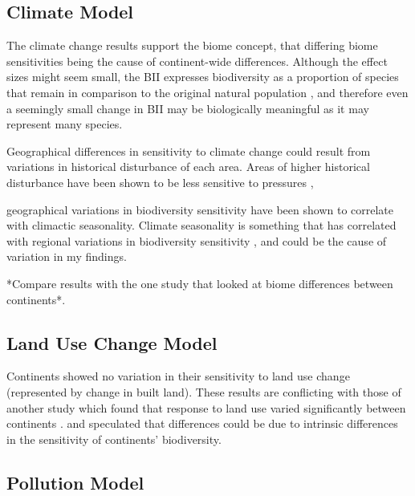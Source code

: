 \documentclass[11pt, a4paper, titlepage]{article}
\begin{document}
     \subsection*{Climate Model}
     
     The climate change results support the biome concept, that  differing biome sensitivities being the cause of continent-wide differences. Although the effect sizes might seem small, the BII expresses biodiversity as a proportion of species that remain in comparison to the original natural population \citep{phillips2021}, and therefore even a seemingly small change in BII may be biologically meaningful as it may represent many species.

     Geographical differences in sensitivity to climate change could result from variations in historical disturbance of each area. Areas of higher historical disturbance have been shown to be less sensitive to pressures \citep{newbold2020tropical, willmer2022global}, %
     
     geographical variations in biodiversity sensitivity have been shown to correlate with climactic seasonality.
     Climate seasonality is something that has correlated with regional variations in biodiversity sensitivity \citep{newbold2016global, newbold2020tropical}, and could be the cause of variation in my findings.
     
     *Compare results with the one study that looked at biome differences between continents*.
	\subsection*{Land Use Change Model}
    Continents showed no variation in their sensitivity to land use change (represented by change in built land). These results are conflicting with those of another study which found that response to land use varied significantly between continents \citep{gibson2011primary, phillips2016effects}. \citet{gibson2011primary} and speculated that differences could be due to intrinsic differences in the sensitivity of continents' biodiversity. 
     \subsection*{Pollution Model}
     
\end{document}
